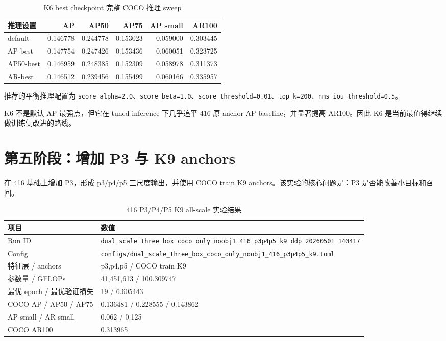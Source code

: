 \documentclass[11pt,a4paper]{article}
\begin{document}
\begin{CJK*}{UTF8}{gbsn}
\begin{table}[H]
  \centering
  \caption{K6 best checkpoint 完整 COCO 推理 sweep}
  \label{tab:k6-sweep}
  \begin{tabular}{lrrrrr}
    \toprule
    推理设置 & AP & AP50 & AP75 & AP small & AR100 \\
    \midrule
    default & 0.146778 & 0.244778 & 0.153023 & 0.059000 & 0.303445 \\
    AP-best & 0.147754 & 0.247426 & 0.153436 & 0.060051 & 0.323725 \\
    AP50-best & 0.146959 & 0.248385 & 0.152309 & 0.058978 & 0.311373 \\
    AR-best & 0.146512 & 0.239456 & 0.155499 & 0.060166 & 0.335957 \\
    \bottomrule
  \end{tabular}
\end{table}

推荐的平衡推理配置为 \texttt{score\_alpha=2.0}、\texttt{score\_beta=1.0}、\texttt{score\_threshold=0.01}、\texttt{top\_k=200}、\texttt{nms\_iou\_threshold=0.5}。

K6 不是默认 AP 最强点，但它在 tuned inference 下几乎追平 416 原 anchor AP baseline，并显著提高 AR100。因此 K6 是当前最值得继续做训练侧改进的路线。

\section{第五阶段：增加 P3 与 K9 anchors}

在 416 基础上增加 P3，形成 p3/p4/p5 三尺度输出，并使用 COCO train K9 anchors。该实验的核心问题是：P3 是否能改善小目标和召回。

\begin{table}[H]
  \centering
  \caption{416 P3/P4/P5 K9 all-scale 实验结果}
  \label{tab:p3-k9}
  \begin{tabular}{ll}
    \toprule
    项目 & 数值 \\
    \midrule
    Run ID & \texttt{dual\_scale\_three\_box\_coco\_only\_noobj1\_416\_p3p4p5\_k9\_ddp\_20260501\_140417} \\
    Config & \texttt{configs/dual\_scale\_three\_box\_coco\_only\_noobj1\_416\_p3p4p5\_k9.toml} \\
    特征层 / anchors & p3,p4,p5 / COCO train K9 \\
    参数量 / GFLOPs & 41,451,613 / 100.309747 \\
    最优 epoch / 最优验证损失 & 19 / 6.605443 \\
    COCO AP / AP50 / AP75 & 0.136481 / 0.228555 / 0.143862 \\
    AP small / AR small & 0.062 / 0.125 \\
    COCO AR100 & 0.313965 \\
    \bottomrule
  \end{tabular}
\end{table}


\end{CJK*}
\end{document}
